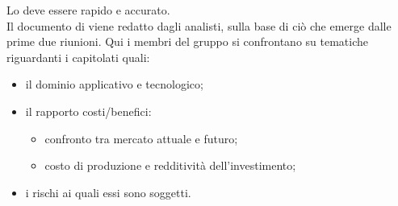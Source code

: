 		Lo  deve essere rapido e accurato.\\
		Il documento di  viene redatto dagli analisti, sulla base di ciò che emerge dalle prime due riunioni. Qui i membri del gruppo si confrontano su tematiche riguardanti i capitolati quali:
		\begin{itemize}
			\item il dominio applicativo e tecnologico;
			\item il rapporto costi/benefici:
			\begin{itemize}
				\item confronto tra mercato attuale e futuro;
				\item costo di produzione e redditività dell'investimento;
			\end{itemize}
			\item i rischi ai quali essi sono soggetti.
		\end{itemize}

